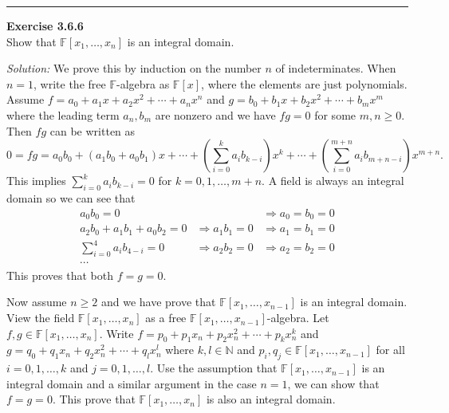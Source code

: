 \documentclass[a4paper, 12pt]{article}
\newenvironment{problem}[2][Exercise]
    { \begin{mdframed}[backgroundcolor=gray!20] \textbf{#1 #2} \\}
    {  \end{mdframed}}
\newenvironment{solution}
    {\textit{Solution:}}
    {}
\begin{document}
\noindent\rule{7in}{2.8pt}
\begin{problem}{3.6.6}
Show that \(\mathbb{F}[x_1,\ldots,x_n]\) is an integral domain.
	
\end{problem}
\begin{solution}
We prove this by induction on the number \(n\) of indeterminates. When \(n=1\), write the free \(\mathbb{F}\)-algebra as \(\mathbb{F}[x]\), where the elements are just polynomials. Assume 
\(f=a_0+a_1x+a_2x^2+\cdots+a_nx^n\) and \(g=b_0+b_1x+b_2x^2+\cdots+b_mx^m\) where the leading term \(a_n,b_m\) are nonzero and we have \(fg=0\) for some \(m,n\geq 0\). Then \(fg\) can be written as 
\[0=fg=a_0b_0+(a_1b_0+a_0b_1)x+\cdots+(\sum_{i=0}^{k}a_ib_{k-i})x^k+\cdots+(\sum_{i=0}^{m+n}a_ib_{m+n-i})x^{m+n}.\]
This implies \(\sum_{i=0}^{k}a_ib_{k-i}=0\) for \(k=0,1,\ldots,m+n\). A field is always an integral domain so we can see that 
\begin{align*}
	a_0b_0=0 & & \Rightarrow a_0=b_0=0  \\ 
	a_2b_0+a_1b_1+a_0b_2=0 & \Rightarrow a_1b_1=0 &\Rightarrow a_1=b_1=0\\ 
	\sum_{i=0}^{4}a_ib_{4-i}=0 &\Rightarrow a_2b_2=0 &\Rightarrow a_2=b_2=0\\ 
	\cdots 
\end{align*}
This proves that both \(f=g=0\).
\par 
Now assume \(n\geq 2\) and we have prove that \(\mathbb{F}[x_1,\ldots,x_{n-1}]\) is an integral domain. View the field \(\mathbb{F}[x_1,\ldots,x_n]\) as a free \(\mathbb{F}[x_1,\ldots,x_{n-1}]\)-algebra. 
Let \(f,g\in \mathbb{F}[x_1,\ldots,x_n]\). Write \(f=p_0+p_1x_n+p_2x_n^2+\cdots+p_kx_n^k\) and \(g=q_0+q_1x_n+q_2x_n^2+\cdots+q_lx_n^l\) where \(k,l\in \mathbb{N}\) and \(p_i,q_j\in \mathbb{F}[x_1,\ldots,x_{n-1}]\) for all 
\(i=0,1,\ldots,k\) and \(j=0,1,\ldots,l\). Use the assumption that \(\mathbb{F}[x_1,\ldots,x_{n-1}]\) is an integral domain and a similar argument in the case \(n=1\), we can show that \(f=g=0\). This prove that \(\mathbb{F}[x_1,\ldots,x_n]\) is also 
an integral domain. 
\end{solution}
\end{document}

